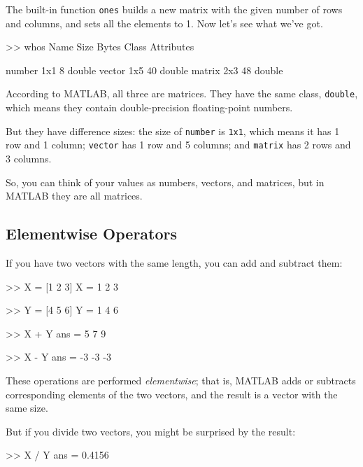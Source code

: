 The built-in function {\tt ones} builds a new matrix with the given
number of rows and columns, and sets all the elements to 1.
Now let's see what we've got.


\begin{code}
>> whos
  Name        Size            Bytes  Class     Attributes

  number      1x1                 8  double              
  vector      1x5                40  double               
  matrix      2x3                48  double              
\end{code}

According to MATLAB, all three are matrices.  They have the same class, {\tt double}, which
means they contain double-precision floating-point numbers.


But they have difference sizes: the size of {\tt number} is {\tt 1x1}, which means it has 1 row and 1 column; {\tt vector} has 1 row and 5 columns; and {\tt matrix} has 2 rows and 3 columns.

So, you can think of your values as
numbers, vectors, and matrices, but in MATLAB they are all matrices.


\subsection{Elementwise Operators}
\label{elementwise}


If you have two vectors with the same length, you can add and subtract them:

\begin{code}
>> X = [1 2 3]
X = 1     2     3

>> Y = [4 5 6]
Y = 1     4     6

>> X + Y
ans = 5     7     9

>> X - Y
ans = -3    -3    -3
\end{code}

These operations are performed \emph{elementwise}; that is, MATLAB adds or subtracts corresponding elements of the two vectors, and the result is a vector with the same size.

But if you divide two vectors, you might be surprised by the result:

\begin{code}
>> X / Y
ans = 0.4156
\end{code}

